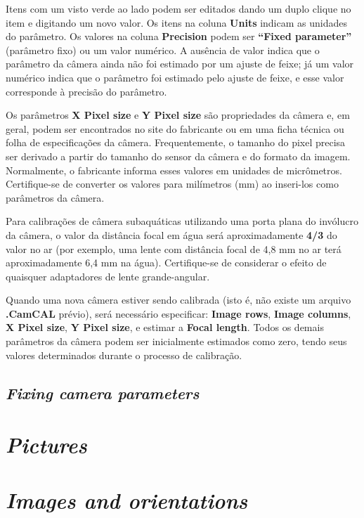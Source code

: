 \documentclass[
  12pt,
  letterpaper,
  DIV=11,
  numbers=noendperiod]{scrreprt}
\begin{document}
Itens com um visto verde ao lado podem ser editados dando um duplo
clique no item e digitando um novo valor. Os itens na coluna
\textbf{Units} indicam as unidades do parâmetro. Os valores na coluna
\textbf{Precision} podem ser \textbf{``Fixed parameter''} (parâmetro
fixo) ou um valor numérico. A ausência de valor indica que o parâmetro
da câmera ainda não foi estimado por um ajuste de feixe; já um valor
numérico indica que o parâmetro foi estimado pelo ajuste de feixe, e
esse valor corresponde à precisão do parâmetro.

Os parâmetros \textbf{X Pixel size} e \textbf{Y Pixel size} são
propriedades da câmera e, em geral, podem ser encontrados no site do
fabricante ou em uma ficha técnica ou folha de especificações da câmera.
Frequentemente, o tamanho do pixel precisa ser derivado a partir do
tamanho do sensor da câmera e do formato da imagem. Normalmente, o
fabricante informa esses valores em unidades de micrômetros.
Certifique-se de converter os valores para milímetros (mm) ao inseri-los
como parâmetros da câmera.

Para calibrações de câmera subaquáticas utilizando uma porta plana do
invólucro da câmera, o valor da distância focal em água será
aproximadamente \textbf{4/3} do valor no ar (por exemplo, uma lente com
distância focal de 4,8 mm no ar terá aproximadamente 6,4 mm na água).
Certifique-se de considerar o efeito de quaisquer adaptadores de lente
grande-angular.

Quando uma nova câmera estiver sendo calibrada (isto é, não existe um
arquivo \textbf{.CamCAL} prévio), será necessário especificar:
\textbf{Image rows}, \textbf{Image columns}, \textbf{X Pixel size},
\textbf{Y Pixel size}, e estimar a \textbf{Focal length}. Todos os
demais parâmetros da câmera podem ser inicialmente estimados como zero,
tendo seus valores determinados durante o processo de calibração.

\subsection{\texorpdfstring{\emph{Fixing camera
parameters}}{Fixing camera parameters}}\label{fixing-camera-parameters}

\section{\texorpdfstring{\emph{Pictures}}{Pictures}}\label{pictures}

\section{\texorpdfstring{\emph{Images and
orientations}}{Images and orientations}}\label{images-and-orientations}
\end{document}
